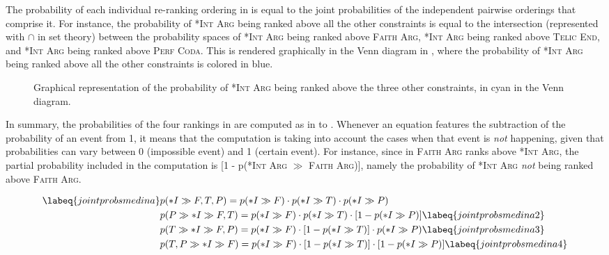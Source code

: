 The probability of each individual re-ranking ordering in  is equal to the joint probabilities of the independent pairwise orderings that comprise it. For instance, the probability of \textsc{*Int Arg} being ranked above all the other constraints is equal to the intersection (represented with $\cap$ in set theory) between the probability spaces of \textsc{*Int Arg} being ranked above \textsc{Faith Arg}, \textsc{*Int Arg} being ranked above \textsc{Telic End}, and \textsc{*Int Arg} being ranked above \textsc{Perf Coda}. This is rendered graphically in the Venn diagram in , where the probability of \textsc{*Int Arg} being ranked above all the other constraints is colored in blue.

\begin{figure}[htb]
\caption{Graphical representation of the probability of \textsc{*Int Arg} being ranked above the three other constraints, in cyan in the Venn diagram.}
    \end{figure}

In summary, the probabilities of the four rankings in  are computed as in  to . Whenever an equation features the subtraction of the probability of an event from 1, it means that the computation is taking into account the cases when that event is \textit{not} happening, given that probabilities can vary between 0 (impossible event) and 1 (certain event). For instance, since in  \textsc{Faith Arg} ranks above \textsc{*Int Arg}, the partial probability included in the computation is [1 - p(\textsc{*Int Arg} $\gg$ \textsc{Faith Arg})], namely the probability of \textsc{*Int Arg} \textit{not} being ranked above \textsc{Faith Arg}. 

\begin{align}  \labeq{jointprobsmedina} %
    & p(*I \gg {F, T, P}) = p(*I \gg F) \cdot p(*I \gg T) \cdot p(*I \gg P) \\
    & p(P \gg *I \gg {F, T}) = p(*I \gg F) \cdot p(*I \gg T) \cdot [1 - p(*I \gg P)] \labeq{jointprobsmedina2}\\
    & p(T \gg *I \gg {F, P}) = p(*I \gg F) \cdot [1 - p(*I \gg T)] \cdot p(*I \gg P) \labeq{jointprobsmedina3}\\
    & p({T, P} \gg *I \gg F) = p(*I \gg F) \cdot [1 - p(*I \gg T)] \cdot [1 - p(*I \gg P)] \labeq{jointprobsmedina4}
\end{align}

